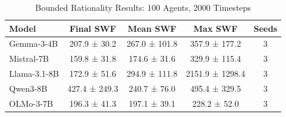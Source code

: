 \begin{table}[h]
\centering
\caption{Bounded Rationality Results: 100 Agents, 2000 Timesteps}
\begin{tabular}{lcccc}
\toprule
Model & Final SWF & Mean SWF & Max SWF & Seeds \\
\midrule
Gemma-3-4B & 207.9 ± 30.2 & 267.0 ± 101.8 & 357.9 ± 177.2 & 3 \\
Mistral-7B & 159.8 ± 31.8 & 174.6 ± 31.6 & 329.9 ± 115.4 & 3 \\
Llama-3.1-8B & 172.9 ± 51.6 & 294.9 ± 111.8 & 2151.9 ± 1298.4 & 3 \\
Qwen3-8B & 427.4 ± 249.3 & 240.7 ± 76.0 & 495.4 ± 329.5 & 3 \\
OLMo-3-7B & 196.3 ± 41.3 & 197.1 ± 39.1 & 228.2 ± 52.0 & 3 \\
\bottomrule
\end{tabular}
\label{tab:bounded_results}
\end{table}
